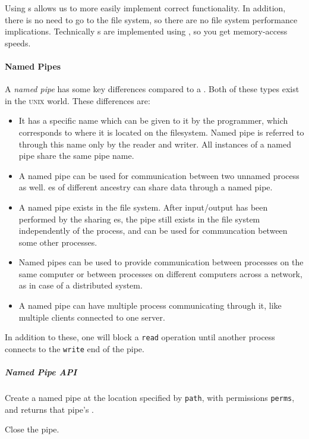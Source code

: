 Using s allows us to more easily implement correct  functionality.
In addition, there is no need to go to the file system, so there are no file system performance implications.
Technically s are implemented using , so you get memory-access speeds.

\paragraph{Named Pipes}\label{par:Named_Pipes}
\begin{definition}\label{def:Named_Pipe}
  A \emph{named pipe} has some key differences compared to a .
  Both of these types exist in the \textsc{unix} world.
  These differences are:
  \begin{itemize}[noitemsep]
  \item It has a specific name which can be given to it by the programmer, which corresponds to where it is located on the filesystem.
    Named pipe is referred to through this name only by the reader and writer.
    All instances of a named pipe share the same pipe name.
  \item A named pipe can be used for communication between two unnamed process as well.
    es of different ancestry can share data through a named pipe.
  \item A named pipe exists in the file system.
    After input/output has been performed by the sharing es, the pipe still exists in the file system independently of the process, and can be used for communcation between some other processes.
  \item Named pipes can be used to provide communication between processes on the same computer or between processes on different computers across a network, as in case of a distributed system.
  \item A named pipe can have multiple process communicating through it, like multiple clients connected to one server.
  \end{itemize}

  In addition to these, one  will block a \texttt{read} operation until another process connects to the \texttt{write} end of the pipe.
\end{definition}

\subparagraph{Named Pipe API}\label{subpar:Named_Pipe_API}
\begin{description}[noitemsep]
\item[\cinline{int mkfifo(const char *path, mode_t perms)}] Create a named pipe at the location specified by \texttt{path}, with permissions \texttt{perms}, and returns that pipe's .
\item[\cinline{close(int fd)}] Close the pipe.
\end{description}

